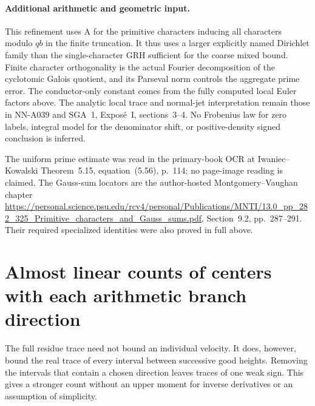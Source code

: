\paragraph{Additional arithmetic and geometric input.}
This refinement uses A for the primitive characters inducing
all characters modulo $qb$ in the finite truncation. It thus
uses a larger explicitly named Dirichlet family than the
single-character GRH sufficient for the coarse mixed bound.
Finite character orthogonality is the actual Fourier decomposition
of the cyclotomic Galois quotient, and its Parseval norm controls
the aggregate prime error. The conductor-only constant comes
from the fully computed local Euler factors above. The analytic
local trace and normal-jet interpretation remain those in NN-A039
and SGA~1, Expos\'e~I, sections~3--4. No Frobenius law for
zero labels, integral model for the denominator shift, or
positive-density signed conclusion is inferred.

The uniform prime estimate was read in the primary-book OCR
at Iwaniec--Kowalski Theorem~5.15, equation~(5.56), p.~114;
no page-image reading is claimed. The Gauss-sum locators are
the author-hosted Montgomery--Vaughan chapter
\url{https://personal.science.psu.edu/rcv4/personal/Publications/MNTI/13.0_pp_282_325_Primitive_characters_and_Gauss_sums.pdf},
Section~9.2, pp.~287--291. Their required specialized identities
were also proved in full above.


\section{Almost linear counts of centers with each arithmetic branch direction}
\label{sec:analytic-signed-cells}

The full residue trace need not bound an individual velocity. It does,
however, bound the real trace of every interval between successive
good heights. Removing the intervals that contain a chosen direction
leaves traces of one weak sign. This gives a stronger count without
an upper moment for inverse derivatives or an assumption of simplicity.

